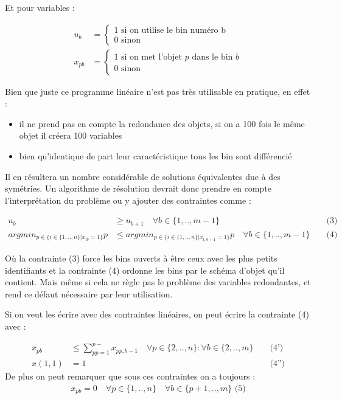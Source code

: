 \documentclass{article}
\begin{document}
Et pour variables :

\begin{align*}
    u_b &= \begin{cases}
        1 \text{ si on utilise le bin numéro b} \\
        0 \text{ sinon}
    \end{cases} \\
    x_{pb} &= \begin{cases}
            1 \text{ si on met l'objet $p$ dans le bin $b$} \\
            0 \text{ sinon}
    \end{cases}
\end{align*}

Bien que juste ce programme linéaire n'est pas très utilisable en pratique, en effet :

\begin{itemize}
    \item il ne prend pas en compte la redondance des objets, si on a 100 fois le même objet il créera 100 variables
    \item bien qu'identique de part leur caractéristique tous les bin sont différencié
\end{itemize}

Il en résultera un nombre considérable de solutions équivalentes due à des symétries. Un algorithme de résolution devrait donc prendre en compte l’interprétation du problème ou y ajouter des contraintes comme :

\begin{align*}
    u_b &\geqslant u_{b+1} \quad \forall b \in \{ 1 , .., m-1 \} &&\text{ (3)} \\
    argmin_{ p \in \{ i \in \{ 1 , .., n \} | x_{ib} = 1 \} } p &\leqslant argmin_{ p \in \{ i \in \{ 1 , .., n \} | x_{i,b+1} = 1 \} } p \quad \forall b \in \{ 1 , .., m-1 \} &&\text{ (4)}
\end{align*}

Où la contrainte (3) force les bins ouverts à être ceux avec les plus petits identifiants et la contrainte (4) ordonne les bins par le schéma d'objet qu'il contient. Mais même si cela ne règle pas le problème des variables redondantes, et rend ce défaut nécessaire par leur utilisation. \newline

Si on veut les écrire avec des contraintes linéaires, on peut écrire la contrainte (4) avec :

\begin{align*}
    x_{pb} &\leqslant \sum \limits_{pp = 1}^{p-} x_{pp,b-1} \quad \forall p \in \{ 2 , .., n \} : \forall b \in \{ 2 , .., m \} &&\text{ (4')}\\
     x(1,1) &= 1 &&\text{ (4'')}
\end{align*}
De plus on peut remarquer que sous ces contraintes on a toujours :
\begin{align*}
    x_{pb} = 0 \quad \forall p \in \{ 1 , .., n \} \quad \forall b \in \{ p+1 , .., m \} \text{ (5)}
\end{align*}
\end{document}
